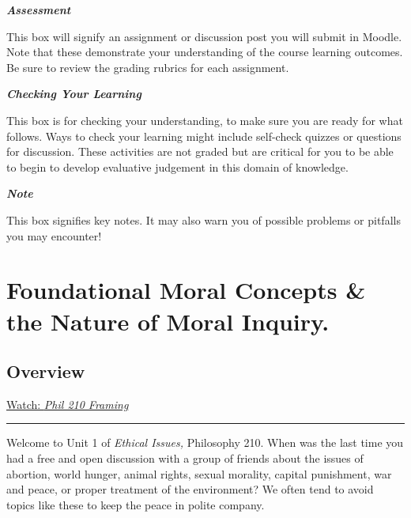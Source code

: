 \documentclass[
]{book}
\begin{document}
\begin{assessment}
\textbf{\emph{Assessment}}

This box will signify an assignment or discussion post you will submit in Moodle. Note that these demonstrate your understanding of the course learning outcomes. Be sure to review the grading rubrics for each assignment.
\end{assessment}

\begin{progress}
\textbf{\emph{Checking Your Learning}}

This box is for checking your understanding, to make sure you are ready for what follows. Ways to check your learning might include self-check quizzes or questions for discussion. These activities are not graded but are critical for you to be able to begin to develop evaluative judgement in this domain of knowledge.
\end{progress}

\begin{caution}
\textbf{\emph{Note}}

This box signifies key notes. It may also warn you of possible problems or pitfalls you may encounter!
\end{caution}

\hypertarget{foundational-moral-concepts-the-nature-of-moral-inquiry.}{%
\chapter{Foundational Moral Concepts \& the Nature of Moral Inquiry.}\label{foundational-moral-concepts-the-nature-of-moral-inquiry.}}

\hypertarget{overview}{%
\section*{Overview}\label{overview}}

\href{https://web.microsoftstream.com/video/ebe7fb5f-e48e-4080-9a07-f4bfd8c3d0be}{Watch: \emph{Phil 210 Framing}}

\begin{center}\rule{0.5\linewidth}{0.5pt}\end{center}

Welcome to Unit 1 of \emph{Ethical Issues,} Philosophy 210. When was the last time you had a free and open discussion with a group of friends about the issues of abortion, world hunger, animal rights, sexual morality, capital punishment, war and peace, or proper treatment of the environment? We often tend to avoid topics like these to keep the peace in polite company.
\end{document}
